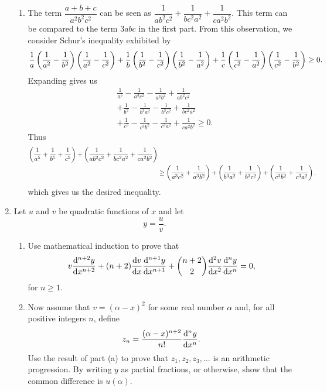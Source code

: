 \begin{enumerate}
\begin{solution}
\begin{enumerate}[label=(\alph*)]
\item The term $\dfrac{a+b+c}{a^2b^2c^2}$ can be seen as $\dfrac{1}{ab^2c^2}+\dfrac{1}{bc^2a^2}+\dfrac{1}{ca^2b^2}$. This term can be compared to the term $3abc$ in the first part. From this observation, we consider Schur's inequality exhibited by
\[ \frac{1}{a}\left(\frac{1}{a^2}-\frac{1}{b^2}\right)\left(\frac{1}{a^2}-\frac{1}{c^2}\right)+\frac{1}{b}\left(\frac{1}{b^2}-\frac{1}{c^2}\right)\left(\frac{1}{b^2}-\frac{1}{a^2}\right)+\frac{1}{c}\left(\frac{1}{c^2}-\frac{1}{a^2}\right)\left(\frac{1}{c^2}-\frac{1}{b^2}\right)\ge0. \]
Expanding gives us
\begin{align*}
&\frac{1}{a^5}-\frac{1}{a^3c^2}-\frac{1}{a^3b^2}+\frac{1}{ab^2c^2}\\
&+\frac{1}{b^5}-\frac{1}{b^3a^2}-\frac{1}{b^3c^2}+\frac{1}{bc^2a^2}\\
&+\frac{1}{c^5}-\frac{1}{c^3b^2}-\frac{1}{c^3a^2}+\frac{1}{ca^2b^2}\ge0.
\end{align*}
Thus
\begin{align*}
\left(\frac{1}{a^5}+\frac{1}{b^5}+\frac{1}{c^5}\right)+\left(\frac{1}{ab^2c^2}+\frac{1}{bc^2a^2}+\frac{1}{ca^2b^2}\right)\\
&\ge\left(\frac{1}{a^3c^2}+\frac{1}{a^3b^2}\right)+\left(\frac{1}{b^3a^2}+\frac{1}{b^3c^2}\right)+\left(\frac{1}{c^3b^2}+\frac{1}{c^3a^2}\right).
\end{align*}
which gives us the desired inequality.
\end{enumerate}
\end{solution}

\item Let $u$ and $v$ be quadratic functions of $x$ and let
\[ y=\frac{u}{v}. \]
\begin{enumerate}[label=(\alph*)]
\item Use mathematical induction to prove that
\[ v\dv[n+2]{y}{x}+(n+2)\dv{v}{x}\dv[n+1]{y}{x}+\binom{n+2}{2}\dv[2]{v}{x}\dv[n]{y}{x}=0, \]
for $n\ge1$.
\item Now assume that $v=(\alpha-x)^2$ for some real number $\alpha$ and, for all positive integers $n$, define
\[ z_n=\frac{(\alpha-x)^{n+2}}{n!}\dv[n]{y}{x}. \]
Use the result of part (a) to prove that $z_1,z_2,z_3,\dots$ is an arithmetic progression. By writing $y$ as partial fractions, or otherwise, show that the common difference is $u(\alpha)$.
\end{enumerate}
\end{enumerate}
\pagebreak

